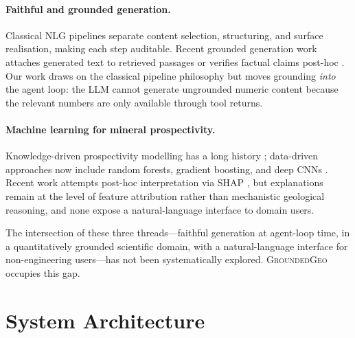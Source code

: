 \documentclass[11pt]{article}
\begin{document}
\paragraph{Faithful and grounded generation.}
Classical NLG pipelines \citep{reiter2000building} separate content
selection, structuring, and surface realisation, making each step
auditable. Recent grounded generation work attaches generated text to
retrieved passages \citep{lewis2020retrieval,bohnet2022attributed} or
verifies factual claims post-hoc \citep{min2023factscore}. Our work
draws on the classical pipeline philosophy but moves grounding
\emph{into} the agent loop: the LLM cannot generate ungrounded numeric
content because the relevant numbers are only available through tool
returns.

\paragraph{Machine learning for mineral prospectivity.}
Knowledge-driven prospectivity modelling has a long history
\citep{carranza2017improved}; data-driven approaches now include
random forests, gradient boosting, and deep CNNs
\citep{zuo2020deep,sun2020data}. Recent work attempts post-hoc
interpretation via SHAP \citep{wang2022deep}, but explanations remain
at the level of feature attribution rather than mechanistic geological
reasoning, and none expose a natural-language interface to domain
users.

The intersection of these three threads---faithful generation at
agent-loop time, in a quantitatively grounded scientific domain, with
a natural-language interface for non-engineering users---has not been
systematically explored. \textsc{GroundedGeo} occupies this gap.

\section{System Architecture}
\label{sec:architecture}
\end{document}
